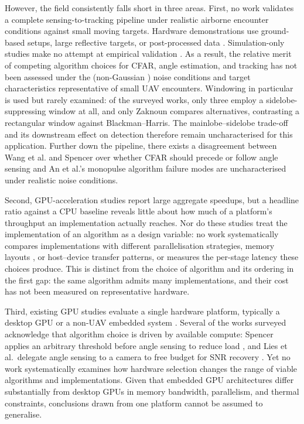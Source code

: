 However, the field consistently falls short in three areas. First, no work
validates a complete sensing-to-tracking pipeline under realistic airborne
encounter conditions against small moving targets. Hardware demonstrations
use ground-based setups, large reflective targets, or post-processed
data \cite{sysak2025_lightweight_compact_pulse_radar_uav_collision_avoidance,
6044363, Moses2014}. Simulation-only studies make no attempt at empirical
validation \cite{Wang2016, Lies2020}. As a result, the relative
merit of competing algorithm choices for CFAR, angle estimation, and tracking
has not been assessed under the (non-Gaussian \cite{ezuma2019microuav}) 
noise conditions and target characteristics
representative of small UAV encounters. Windowing in particular is used but 
rarely examined: of the
surveyed works, only three employ a sidelobe-suppressing window at all, and only
Zaknoun \cite{zaknoun2024_realtime_gpu_accelerated_radar_processing} compares
alternatives, contrasting a rectangular window against Blackman--Harris. The
mainlobe--sidelobe trade-off and its downstream effect on detection therefore
remain uncharacterised for this application. Further down the pipeline, there exists 
a disagreement between Wang et al. and Spencer over whether CFAR should precede 
or follow angle sensing \cite{Wang2016,compact_spencer_2015} and An et al.'s 
monopulse algorithm failure modes are uncharacterised under realistic noise 
conditions.

Second, GPU-acceleration studies report large aggregate speedups, but a headline 
ratio against a CPU baseline reveals little about how much of a platform's 
throughput an implementation actually reaches. Nor do these studies treat the 
implementation of an algorithm as a design variable: no work systematically 
compares implementations with different parallelisation strategies, memory layouts
, or host--device transfer patterns, or measures the per-stage latency these 
choices produce. This is distinct from the choice of algorithm and its ordering in 
the first gap: the same algorithm admits many implementations, and their cost has 
not been measured on representative hardware.

Third, existing GPU studies evaluate a single hardware platform, typically a 
desktop GPU \cite{rs15225421, Mondal2024_gpu_radar} or a non-UAV embedded system 
\cite{zaknoun2024_realtime_gpu_accelerated_radar_processing}. Several of the works 
surveyed acknowledge that algorithm choice is driven by available compute: Spencer 
applies an arbitrary threshold before angle sensing to reduce load 
\cite{compact_spencer_2015}, and Lies et al.\ delegate angle sensing to a camera 
to free 
budget for SNR recovery \cite{Lies2020}. Yet no work systematically examines how 
hardware selection changes the range of viable algorithms and implementations. 
Given that embedded GPU architectures differ substantially from desktop GPUs in 
memory bandwidth, parallelism, and thermal constraints, conclusions drawn from one 
platform cannot be assumed to generalise.

